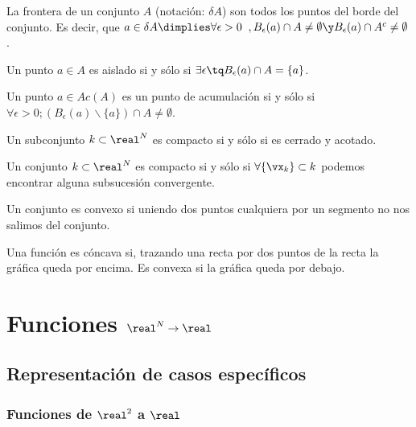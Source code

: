 \documentclass[nochap]{apuntes}
\begin{document}
\begin{defn}[Frontera] La frontera de un conjunto $A$ (notación: $\delta A$) son todos los puntos del borde del conjunto. Es decir, que $a\in \delta A \dimplies \forall \epsilon > 0\;\; , B_\epsilon(a) \cap A \neq \emptyset \y B_\epsilon(a) \cap A^c \neq \emptyset$.\end{defn}

\begin{defn} Un punto $a\in A$ es aislado si y sólo si $\exists \epsilon \tq B_\epsilon(a)\cap A =\{a\}$.\end{defn}

\begin{defn} Un punto $a\in Ac(A)$ es un punto de acumulación si y sólo si $\forall \epsilon > 0; (B_\epsilon(a) \backslash \{a\})\cap A \neq \emptyset$.\end{defn}

\begin{defn} Un subconjunto $k\subset \real^N$ es compacto si y sólo si es cerrado y acotado.\end{defn}

\begin{theorem} Un conjunto $k\subset \real^N$ es compacto si y sólo si $\forall \{\vx_k\} \subset k$ podemos encontrar alguna subsucesión convergente.\end{theorem}

\begin{defn} Un conjunto es convexo si uniendo dos puntos cualquiera por un segmento no nos salimos del conjunto.\end{defn}

\begin{defn} Una función es cóncava si, trazando una recta por dos puntos de la recta la gráfica queda por encima. Es convexa si la gráfica queda por debajo.\end{defn}
\section{Funciones $\real^N\to\real$}

\subsection{Representación de casos específicos}
\subsubsection{Funciones de $\real^2$ a $\real$}
\end{document}
